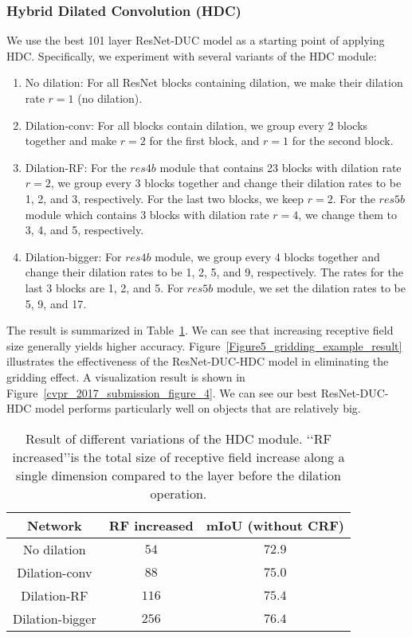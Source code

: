 \documentclass[10pt,twocolumn,letterpaper]{article}
\begin{document}
\subsubsection{Hybrid Dilated Convolution (HDC)}
We use the best 101 layer ResNet-DUC model as a starting point of applying HDC. Specifically, we experiment with several variants of the HDC module:
\begin{enumerate}
  \item No dilation: For all ResNet blocks containing dilation, we make their dilation rate $r=1$ (no dilation).
  \item Dilation-conv: For all blocks contain dilation, we group every 2 blocks together and make $r=2$ for the first block, and $r=1$ for the second block.
  \item Dilation-RF: For the $res4b$ module that contains 23 blocks with dilation rate $r=2$, we group every 3 blocks together and change their dilation rates to be 1, 2, and 3, respectively. For the last two blocks, we keep $r=2$. For the $res5b$ module which contains 3 blocks with dilation rate $r=4$, we change them to 3, 4, and 5, respectively.
  \item Dilation-bigger: For $res4b$ module, we group every 4 blocks together and change their dilation rates to be 1, 2, 5, and 9, respectively. The rates for the last 3 blocks are 1, 2, and 5. For $res5b$ module, we set the dilation rates to be 5, 9, and 17.
\end{enumerate}
The result is summarized in Table~\ref{table_2}. We can see that increasing receptive field size generally yields higher accuracy. Figure~\ref{Figure5_gridding_example_result} illustrates the effectiveness of the ResNet-DUC-HDC model in eliminating the gridding effect. A visualization result is shown in Figure~\ref{cvpr_2017_submission_figure_4}. We can see our best ResNet-DUC-HDC model performs particularly well on objects that are relatively big.
\begin{table}[ht]
\begin{center}
\begin{tabular}{cc|c} \toprule[1.75pt]{Network}           &     {RF increased}  &{mIoU (without CRF)}\\ \midrule
   No dilation    &     $54$      & $72.9$\\
   Dilation-conv  &     $88$         & $75.0$ \\
   Dilation-RF    &     $116$      & $75.4$ \\
   Dilation-bigger &    $256$         & $76.4$ \\ \bottomrule[1.75pt]
\end{tabular}
\vspace{2pt}
\caption{Result of different variations of the HDC module. \lq\lq RF increased\rq\rq is the total size of receptive field increase along a single dimension compared to the layer before the dilation operation.}
\label{table_2}
\end{center}
\vspace{-15pt}
\end{table}
\end{document}
